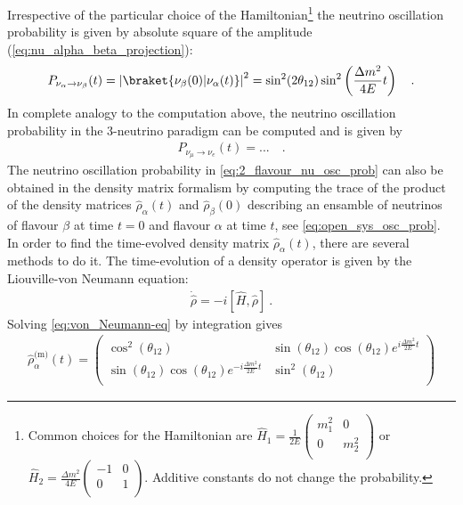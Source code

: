 %
Irrespective of the particular choice of the Hamiltonian\footnote{Common choices for the Hamiltonian are $\hat{H}_1 = \frac{1}{2E}\begin{pmatrix}
    m^2_1 & 0 \\
    0 & m^2_2 \\
\end{pmatrix}$ or $\hat{H}_2 = \frac{\Delta m^2}{4E}\begin{pmatrix}
    -1 & 0 \\
    0 & 1 \\
\end{pmatrix}$. Additive constants do not change the probability.} the neutrino oscillation probability is given by absolute square of the amplitude (\ref{eq:nu_alpha_beta_projection}):
%
\begin{align} \label{eq:2_flavour_nu_osc_prob}
    P_{\nu_\alpha \rightarrow \nu_\beta} (t) = \left|\braket{\nu_\beta(0)|\nu_\alpha(t)} \right|^2 = \sin^2(2\theta_{12}) \sin^2\left(\frac{\Delta m ^2}{4E}t\right) \quad \text{.}
\end{align}
%
In complete analogy to the computation above, the neutrino oscillation probability in the $3$-neutrino paradigm can be computed and is given by
%
\begin{align} \label{eq:3_flavour_nu_osc_prob}
    P_{\nu_\mu \rightarrow \nu_e} (t) = ... \quad \text{.}
\end{align}
%
The neutrino oscillation probability in \cref{eq:2_flavour_nu_osc_prob} can also be obtained in the density matrix formalism by computing the trace of the product of the density matrices  $\hat{\rho}_\alpha(t)$ and $\hat{\rho}_\beta(0)$ describing an ensamble of neutrinos of flavour $\beta$ at time $t=0$ and flavour $\alpha$ at time $t$, see \cref{eq:open_sys_osc_prob}. In order to find the time-evolved density matrix $\hat{\rho}_\alpha(t)$, there are several methods to do it. The time-evolution of a density operator is given by the Liouville-von Neumann equation: 
%
\begin{align} \label{eq:von_Neumann-eq}
    \dot{\hat{\rho}} = -i [\hat{H},\hat{\rho} ] \ \text{.}
\end{align}
%
Solving \cref{eq:von_Neumann-eq} by integration gives
%
\begin{align} \label{eq:rho_alpha_t}
    \hat{\rho}^\text{(m)}_\alpha(t) =
    \begin{pmatrix}
        \cos^2(\theta_{12}) & \sin(\theta_{12})\cos(\theta_{12})e^{i\frac{\Delta m^2}{2E}t} \\
        \sin(\theta_{12})\cos(\theta_{12})e^{-i\frac{\Delta m^2}{2E}t} & \sin^2(\theta_{12}) \\
    \end{pmatrix}
\end{align}
